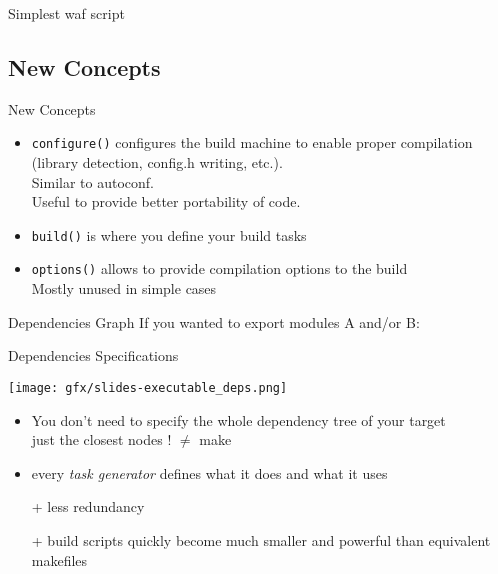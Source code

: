 \documentclass[xetex]{beamer}
\begin{document}
\begin{frame}[fragile]{Simplest waf script}
	\scriptsize
	
	
\end{frame}

\subsection{New Concepts}

\begin{frame}{New Concepts}
	\begin{itemize}
		\item \texttt{configure()} configures the build machine to enable proper compilation (library detection, config.h writing, etc.).\\
		Similar to autoconf.\\
		Useful to provide better portability of code.
		
		\item \texttt{build()} is where you define your build tasks

		\item \texttt{options()} allows to provide compilation options to the build\\
		Mostly unused in simple cases
	\end{itemize}
\end{frame}

\begin{frame}[fragile]{Dependencies Graph}
	If you wanted to export modules A and/or B:
	
\end{frame}


\begin{frame}{Dependencies Specifications}
	\begin{center}
		\texttt{[image: gfx/slides-executable\_deps.png]}
	\end{center}
	\begin{itemize}
		\item You don't need to specify the whole dependency tree of your target\\
		just the closest nodes ! $\neq$ make
		\item every \textit{task generator} defines what it does and what it uses
		\item[+] less redundancy
		\item[+] build scripts quickly become much smaller and powerful than equivalent makefiles
	\end{itemize}
\end{frame}
\end{document}
